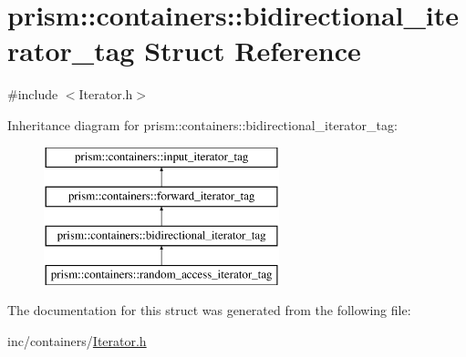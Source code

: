 \hypertarget{structprism_1_1containers_1_1bidirectional__iterator__tag}{}\section{prism\+:\+:containers\+:\+:bidirectional\+\_\+iterator\+\_\+tag Struct Reference}
\label{structprism_1_1containers_1_1bidirectional__iterator__tag}


{\ttfamily \#include $<$Iterator.\+h$>$}

Inheritance diagram for prism\+:\+:containers\+:\+:bidirectional\+\_\+iterator\+\_\+tag\+:\begin{figure}[H]
\begin{center}
\leavevmode
\includegraphics[height=4.000000cm]{structprism_1_1containers_1_1bidirectional__iterator__tag}
\end{center}
\end{figure}


The documentation for this struct was generated from the following file\+:\begin{DoxyCompactItemize}
\item 
inc/containers/\hyperlink{_iterator_8h}{Iterator.\+h}\end{DoxyCompactItemize}
